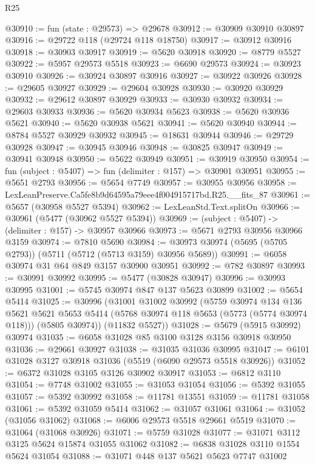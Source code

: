 \begin{lexlean}{R25}
\begin{coremodule}
@30910 := fun (state : @29573) => @29678
@30912 := @30909 @30910 @30897
@30916 := @29722 @118 (@29724 @118 @18750)
@30917 := @30912 @30916
@30918 := @30903 @30917
@30919 := @5620 @30918
@30920 := @8779 @5527
@30922 := @5957 @29573 @5518
@30923 := @6690 @29573
@30924 := @30923 @30910
@30926 := @30924 @30897 @30916
@30927 := @30922 @30926
@30928 := @29605 @30927
@30929 := @29604 @30928
@30930 := @30920 @30929
@30932 := @29612 @30897 @30929
@30933 := @30930 @30932
@30934 := @29603 @30933
@30936 := @5620 @30934 @5623
@30938 := @5620 @30936 @5621
@30940 := @5620 @30938 @5621
@30941 := @5620 @30940
@30944 := @8784 @5527 @30929 @30932
@30945 := @18631 @30944
@30946 := @29729 @30928
@30947 := @30945 @30946
@30948 := @30825 @30947
@30949 := @30941 @30948
@30950 := @5622 @30949
@30951 := @30919 @30950
@30954 := fun (subject : @5407) => fun (delimiter : @157) => @30901 @30951
@30955 := @5651 @2793
@30956 := @5654 @7749
@30957 := @30955 @30956
@30958 := LexLeanPreserve.Ca5fe8b9d64595a79eee4f004915717bd.R25.__fits_87
@30961 := @5657 (@30958 @5527 @5394)
@30962 := LexLeanStd.Text.splitOn
@30966 := @30961 (@5477 (@30962 @5527 @5394))
@30969 := (subject : @5407) -> (delimiter : @157) -> @30957 @30966
@30973 := @5671 @2793 @30956 @30966 @3159
@30974 := @7810 @5690
@30984 := @30973 @30974 (@5695 (@5705 @2793)) (@5711 (@5712 (@5713 @3159) @30956 @5689))
@30991 := @6058 @30974 @31 @64 @849 @3157 @30900 @30951
@30992 := @782 @30897
@30993 := @30991 @30992
@30995 := @5477 (@30828 @30947)
@30996 := @30993 @30995
@31001 := @5745 @30974 @847 @137 @5623 @30899
@31002 := @5654 @5414
@31025 := @30996
    (@31001
      @31002
      @30992
      (@5759
        @30974
        @134
        @136
        @5621
        @5621
        @5653
        @5414
        (@5768 @30974 @118 @5653 (@5773 (@5774 @30974 @118)))
        (@5805 @30974))
      (@11832 @5527))
@31028 := @5679 (@5915 @30992) @30974
@31035 := @6058 @31028 @85 @3100 @3128 @3156 @30918 @30950
@31036 := @29661 @30927
@31038 := @31035 @31036 @30995
@31047 := @6101 @31028 @3127 @30918 @31036 (@5519 (@6090 @29573 @5518 @30926))
@31052 := @6372 @31028 @3105 @3126 @30902 @30917
@31053 := @6812 @3110
@31054 := @7748 @31002
@31055 := @31053 @31054
@31056 := @5392 @31055
@31057 := @5392 @30992
@31058 := @11781 @13551
@31059 := @11781 @31058
@31061 := @5392 @31059 @5414
@31062 := @31057 @31061
@31064 := @31052 (@31056 @31062)
@31068 := @6006 @29573 @5518 @29661 @5519
@31070 := @31064 (@31068 @30926)
@31071 := @5759 @31028
@31077 := @31071 @3112 @3125 @5624 @15874 @31055 @31062
@31082 := @6838 @31028 @3110 @1554 @5624 @31054
@31088 := @31071 @448 @137 @5621 @5623 @7747 @31002

\end{coremodule}
\end{lexlean}
